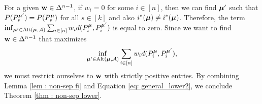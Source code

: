     For a given $\mathbf{w} \in \Delta^{n-1}$, if $w_i = 0$ for some $i \in [n]$, then we can find $\boldsymbol{\mu}'$ such that $P (P^{\boldsymbol{\mu}'}_{s}) = P (P^{\boldsymbol{\mu}}_{s})$ for all $s \in [k]$ and also $i^*(\boldsymbol{\mu}) \neq i^*(\boldsymbol{\mu})$. Therefore, the term $\inf_{\boldsymbol{\mu}' \in \text{Alt}(\boldsymbol{\mu}, \mathcal{A})} \sum_{i \in [n]} w_i d(P^{\boldsymbol{\mu}}_{i}, P^{\boldsymbol{\mu}'}_{i})$ is equal to zero. Since we want to find $\mathbf{w} \in \Delta^{n-1}$ that maximizes
        \begin{align*}
               \inf_{\boldsymbol{\mu}' \in \text{Alt}(\boldsymbol{\mu}, \mathcal{A})} \sum_{i \in [n]} w_i d(P^{\boldsymbol{\mu}}_{i}, P^{\boldsymbol{\mu}'}_{i}),
        \end{align*}
    we must restrict ourselves to \(\mathbf{w}\) with strictly positive entries. By combining Lemma \ref{lem : non-sep fi} and Equation \eqref{eq: general_lower2}, we conclude Theorem \ref{thm : non-sep lower}.


